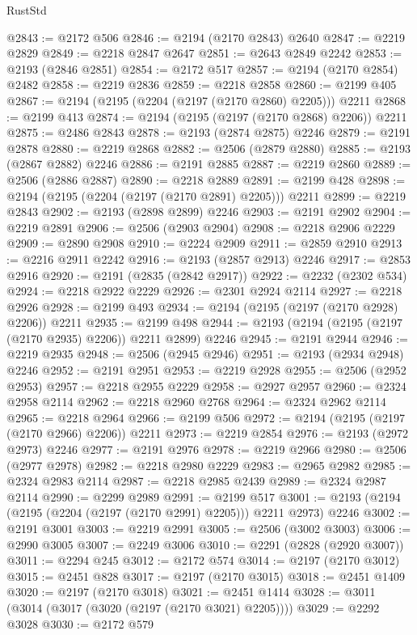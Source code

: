 \begin{lexlean}{RustStd}
\begin{coremodule}
@2843 := @2172 @506
@2846 := @2194 (@2170 @2843) @2640
@2847 := @2219 @2829
@2849 := @2218 @2847 @2647
@2851 := @2643 @2849 @2242
@2853 := @2193 (@2846 @2851)
@2854 := @2172 @517
@2857 := @2194 (@2170 @2854) @2482
@2858 := @2219 @2836
@2859 := @2218 @2858
@2860 := @2199 @405
@2867 := @2194 (@2195 (@2204 (@2197 (@2170 @2860) @2205))) @2211
@2868 := @2199 @413
@2874 := @2194 (@2195 (@2197 (@2170 @2868) @2206)) @2211
@2875 := @2486 @2843
@2878 := @2193 (@2874 @2875) @2246
@2879 := @2191 @2878
@2880 := @2219 @2868
@2882 := @2506 (@2879 @2880)
@2885 := @2193 (@2867 @2882) @2246
@2886 := @2191 @2885
@2887 := @2219 @2860
@2889 := @2506 (@2886 @2887)
@2890 := @2218 @2889
@2891 := @2199 @428
@2898 := @2194 (@2195 (@2204 (@2197 (@2170 @2891) @2205))) @2211
@2899 := @2219 @2843
@2902 := @2193 (@2898 @2899) @2246
@2903 := @2191 @2902
@2904 := @2219 @2891
@2906 := @2506 (@2903 @2904)
@2908 := @2218 @2906 @2229
@2909 := @2890 @2908
@2910 := @2224 @2909
@2911 := @2859 @2910
@2913 := @2216 @2911 @2242
@2916 := @2193 (@2857 @2913) @2246
@2917 := @2853 @2916
@2920 := @2191 (@2835 (@2842 @2917))
@2922 := @2232 (@2302 @534)
@2924 := @2218 @2922 @2229
@2926 := @2301 @2924 @2114
@2927 := @2218 @2926
@2928 := @2199 @493
@2934 := @2194 (@2195 (@2197 (@2170 @2928) @2206)) @2211
@2935 := @2199 @498
@2944 := @2193 (@2194 (@2195 (@2197 (@2170 @2935) @2206)) @2211 @2899) @2246
@2945 := @2191 @2944
@2946 := @2219 @2935
@2948 := @2506 (@2945 @2946)
@2951 := @2193 (@2934 @2948) @2246
@2952 := @2191 @2951
@2953 := @2219 @2928
@2955 := @2506 (@2952 @2953)
@2957 := @2218 @2955 @2229
@2958 := @2927 @2957
@2960 := @2324 @2958 @2114
@2962 := @2218 @2960 @2768
@2964 := @2324 @2962 @2114
@2965 := @2218 @2964
@2966 := @2199 @506
@2972 := @2194 (@2195 (@2197 (@2170 @2966) @2206)) @2211
@2973 := @2219 @2854
@2976 := @2193 (@2972 @2973) @2246
@2977 := @2191 @2976
@2978 := @2219 @2966
@2980 := @2506 (@2977 @2978)
@2982 := @2218 @2980 @2229
@2983 := @2965 @2982
@2985 := @2324 @2983 @2114
@2987 := @2218 @2985 @2439
@2989 := @2324 @2987 @2114
@2990 := @2299 @2989
@2991 := @2199 @517
@3001 := @2193 (@2194 (@2195 (@2204 (@2197 (@2170 @2991) @2205))) @2211 @2973) @2246
@3002 := @2191 @3001
@3003 := @2219 @2991
@3005 := @2506 (@3002 @3003)
@3006 := @2990 @3005
@3007 := @2249 @3006
@3010 := @2291 (@2828 (@2920 @3007))
@3011 := @2294 @245
@3012 := @2172 @574
@3014 := @2197 (@2170 @3012)
@3015 := @2451 @828
@3017 := @2197 (@2170 @3015)
@3018 := @2451 @1409
@3020 := @2197 (@2170 @3018)
@3021 := @2451 @1414
@3028 := @3011 (@3014 (@3017 (@3020 (@2197 (@2170 @3021) @2205))))
@3029 := @2292 @3028
@3030 := @2172 @579

\end{coremodule}
\end{lexlean}
